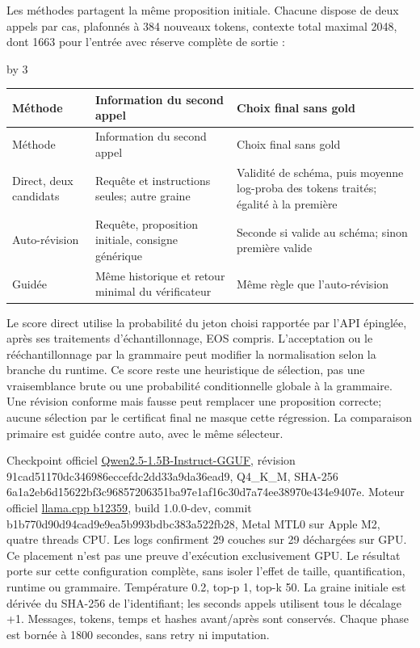 \documentclass[11pt]{article}
\newlength{\QAcolumnwidth}
\begin{document}
Les méthodes partagent la même proposition initiale. Chacune dispose de deux appels par cas, plafonnés à 384 nouveaux tokens, contexte total maximal 2048, dont 1663 pour l’entrée avec réserve complète de sortie :

\begingroup
\small
\setlength{\tabcolsep}{3pt}
\setlength{\QAcolumnwidth}{\dimexpr\linewidth-4\tabcolsep\relax}
\divide\QAcolumnwidth by 3
\begin{longtable}{@{}>{\raggedright\arraybackslash}p{\QAcolumnwidth}>{\raggedright\arraybackslash}p{\QAcolumnwidth}>{\raggedright\arraybackslash}p{\QAcolumnwidth}@{}}
\hline
Méthode & Information du second appel & Choix final sans gold\\
\hline
\endfirsthead
\hline
Méthode & Information du second appel & Choix final sans gold\\
\hline
\endhead
\hline
\endfoot
\hline
\endlastfoot
Direct, deux candidats & Requête et instructions seules; autre graine & Validité de schéma, puis moyenne log-proba des tokens traités; égalité à la première\\
Auto-révision & Requête, proposition initiale, consigne générique & Seconde si valide au schéma; sinon première valide\\
Guidée & Même historique et retour minimal du vérificateur & Même règle que l'auto-révision\\
\end{longtable}
\endgroup

Le score direct utilise la probabilité du jeton choisi rapportée par l'API épinglée, après ses traitements d'échantillonnage, EOS compris. L'acceptation ou le rééchantillonnage par la grammaire peut modifier la normalisation selon la branche du runtime. Ce score reste une heuristique de sélection, pas une vraisemblance brute ou une probabilité conditionnelle globale à la grammaire. Une révision conforme mais fausse peut remplacer une proposition correcte; aucune sélection par le certificat final ne masque cette régression. La comparaison primaire est guidée contre auto, avec le même sélecteur.

Checkpoint officiel \href{\detokenize{https://huggingface.co/Qwen/Qwen2.5-1.5B-Instruct-GGUF/tree/91cad51170dc346986eccefdc2dd33a9da36ead9}}{Qwen2.5-1.5B-Instruct-GGUF}, révision 91cad51170dc346986eccefdc2dd33a9da36ead9, Q4\_K\_M, SHA-256 6a1a2eb6d15622bf3c96857206351ba97e1af16c30d7a74ee38970e434e9407e. Moteur officiel \href{\detokenize{https://github.com/ggml-org/llama.cpp/releases/tag/b12359}}{llama.cpp b12359}, build 1.0.0-dev, commit b1b770d90d94cad9e9ea5b993bdbc383a522fb28, Metal MTL0 sur Apple M2, quatre threads CPU. Les logs confirment 29 couches sur 29 déchargées sur GPU. Ce placement n'est pas une preuve d'exécution exclusivement GPU. Le résultat porte sur cette configuration complète, sans isoler l'effet de taille, quantification, runtime ou grammaire. Température 0.2, top-p 1, top-k 50. La graine initiale est dérivée du SHA-256 de l'identifiant; les seconds appels utilisent tous le décalage +1. Messages, tokens, temps et hashes avant/après sont conservés. Chaque phase est bornée à 1800 secondes, sans retry ni imputation.
\end{document}
